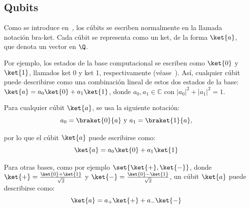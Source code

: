 \subsection{Qubits}
Como se introduce en~\cite{diracBraket}, los cúbits se escriben normalmente en la llamada notación bra-ket.
Cada cúbit se representa como un ket, de la forma $\ket{a}$, que denota un vector en $\Q$.

Por ejemplo, los estados de la base computacional se escriben como $\ket{0}$ y $\ket{1}$, llamados ket 0 y ket 1, respectivamente (véase~\cite{NielsenChuang}).
Así, cualquier cúbit puede describirse como una combinación lineal de estos dos estados de la base: $\ket{a} =a_0\ket{0} +a_1 \ket{1}$, donde $a_0, a_1 \in \mathbb{C}$ con $|a_0|^{2}+|a_1|^{2}=1$.

\begin{notation}
  Para cualquier cúbit $\ket{a}$, se usa la siguiente notación:
  \[a_{0}=\braket{0}{a}\text{ y }a_{1}=\braket{1}{a},\]
\end{notation}
por lo que el cúbit $\ket{a}$ puede escribirse como:
\begin{equation}
  \label{eq:cúbit-coordenadas}
  \ket{a}=a_0\ket{0}+a_1\ket{1}
\end{equation}

Para otras bases, como por ejemplo $\set{\ket{+}, \ket{-}}$, donde $\ket{+}=\frac{\ket{0}+\ket{1}}{\sqrt{2}}$ y $\ket{-}=\frac{\ket{0}-\ket{1}}{\sqrt{2}}$, un cúbit $\ket{a}$ puede describirse como:
\begin{equation*}
  \ket{a}=a_+\ket{+}+a_-\ket{-}
\end{equation*}
